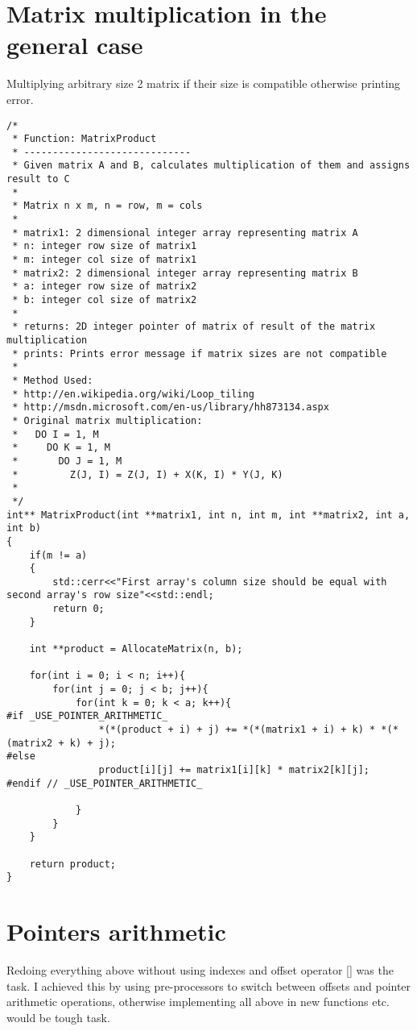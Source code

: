 \documentclass{article}
\begin{document}
\section{Matrix multiplication in the general case}

Multiplying arbitrary size 2 matrix if their size is compatible otherwise printing error.

\begin{lstlisting}[label=lab3.10,caption=Matrix Product]
/*
 * Function: MatrixProduct
 * -----------------------------
 * Given matrix A and B, calculates multiplication of them and assigns result to C
 *
 * Matrix n x m, n = row, m = cols
 *
 * matrix1: 2 dimensional integer array representing matrix A
 * n: integer row size of matrix1
 * m: integer col size of matrix1
 * matrix2: 2 dimensional integer array representing matrix B
 * a: integer row size of matrix2
 * b: integer col size of matrix2
 *
 * returns: 2D integer pointer of matrix of result of the matrix multiplication
 * prints: Prints error message if matrix sizes are not compatible
 *
 * Method Used:
 * http://en.wikipedia.org/wiki/Loop_tiling
 * http://msdn.microsoft.com/en-us/library/hh873134.aspx
 * Original matrix multiplication:
 *   DO I = 1, M
 *     DO K = 1, M
 *       DO J = 1, M
 *         Z(J, I) = Z(J, I) + X(K, I) * Y(J, K)
 *
 */
int** MatrixProduct(int **matrix1, int n, int m, int **matrix2, int a, int b)
{
    if(m != a)
    {
        std::cerr<<"First array's column size should be equal with second array's row size"<<std::endl;
        return 0;
    }

    int **product = AllocateMatrix(n, b);

    for(int i = 0; i < n; i++){
        for(int j = 0; j < b; j++){
            for(int k = 0; k < a; k++){
#if _USE_POINTER_ARITHMETIC_
                *(*(product + i) + j) += *(*(matrix1 + i) + k) * *(*(matrix2 + k) + j);
#else
                product[i][j] += matrix1[i][k] * matrix2[k][j];
#endif // _USE_POINTER_ARITHMETIC_

            }
        }
    }

    return product;
}
\end{lstlisting}	



\section{Pointers arithmetic}

Redoing everything above without using indexes and offset operator [] was the task. I achieved this by using pre-processors to switch between offsets and pointer arithmetic operations, otherwise implementing all above in new functions etc. would be tough task. \\
\end{document}
